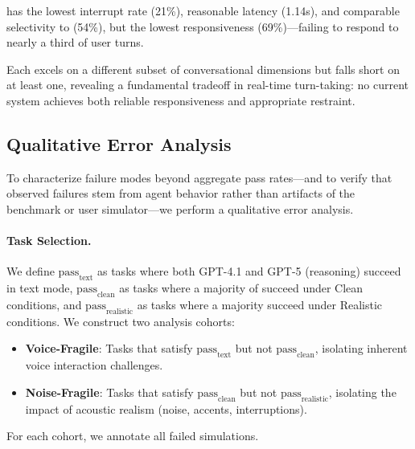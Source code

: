\textbf{} has the lowest interrupt rate (21\%), reasonable latency (1.14s), and comparable selectivity to  (54\%), but the lowest responsiveness (69\%)---failing to respond to nearly a third of user turns.

Each  excels on a different subset of conversational dimensions but falls short on at least one, revealing a fundamental tradeoff in real-time turn-taking: no current system achieves both reliable responsiveness and appropriate restraint.

\subsection{Qualitative Error Analysis}
\label{sec:analysis}

To characterize failure modes beyond aggregate pass rates---and to verify that observed failures stem from agent behavior rather than artifacts of the benchmark or user simulator---we perform a qualitative error analysis.

\paragraph{Task Selection.} We define $\text{pass}_{\text{text}}$ as tasks where both GPT-4.1 and GPT-5 (reasoning) succeed in text mode, $\text{pass}_{\text{clean}}$ as tasks where a majority of  succeed under Clean conditions, and $\text{pass}_{\text{realistic}}$ as tasks where a majority succeed under Realistic conditions. We construct two analysis cohorts:
\begin{itemize}[nosep,leftmargin=*]
    \item \textbf{Voice-Fragile}: Tasks that satisfy $\text{pass}_{\text{text}}$ but not $\text{pass}_{\text{clean}}$, isolating inherent voice interaction challenges.
    \item \textbf{Noise-Fragile}: Tasks that satisfy $\text{pass}_{\text{clean}}$ but not $\text{pass}_{\text{realistic}}$, isolating the impact of acoustic realism (noise, accents, interruptions).
\end{itemize}
For each cohort, we annotate all failed simulations.

